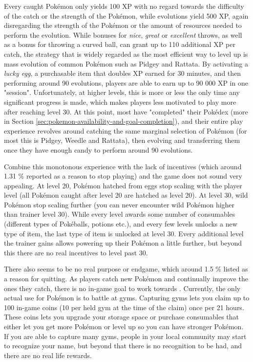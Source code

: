 Every caught Pokémon only yields 100 XP with no regard towards the difficulty of the catch or the strength of the Pokémon, while evolutions yield 500 XP, again disregarding the strength of the Pokémon or the amount of resources needed to perform the evolution. While bonuses for \emph{nice}, \emph{great} or \emph{excellent} throws, as well as a bonus for throwing a curved ball, can grant up to 110 additional XP per catch, the strategy that is widely regarded as the most efficient way to level up is mass evolution of common Pokémon such as Pidgey and Rattata. By activating a \emph{lucky egg}, a purchasable item that doubles XP earned for 30 minutes, and then performing around 90 evolutions, players are able to earn up to 90 000 XP in one "session". Unfortunately, at higher levels, this is more or less the only time any significant progress is made, which makes players less motivated to play more after reaching level 30. At this point, most have "completed" their Pokédex (more in Section \ref{sec:pokemon-availability-and-goal-completion}), and their entire play experience revolves around catching the same marginal selection of Pokémon (for most this is Pidgey, Weedle and Rattata), then evolving and transferring them once they have enough candy to perform around 90 evolutions.

Combine this monotonous experience with the lack of incentives (which around 1.31 \% reported as a reason to stop playing) and the game does not sound very appealing. At level 20, Pokémon hatched from eggs stop scaling with the player level (all Pokémon caught after level 20 are hatched as level 20). At level 30, wild Pokémon stop scaling further (you can never encounter wild Pokémon higher than trainer level 30). While every level awards some number of consumables (different types of Pokéballs, potions etc.), and every few levels unlocks a new type of item, the last type of item is unlocked at level 30. Every additional level the trainer gains allows powering up their Pokémon a little further, but beyond this there are no real incentives to level past 30.

There also seems to be no real purpose or endgame, which around 1.5 \% listed as a reason for quitting. As players catch new Pokémon and continually improve the ones they catch, there is no in-game goal to work towards . Currently, the only actual use for Pokémon is to battle at gyms. Capturing gyms lets you claim up to 100 in-game coins (10 per held gym at the time of the claim) once per 21 hours. These coins lets you upgrade your storage space or purchase consumables that either let you get more Pokémon or level up so you can have stronger Pokémon. If you are able to capture many gyms, people in your local community may start to recognize your name, but beyond that there is no recognition to be had, and there are no real life rewards.

